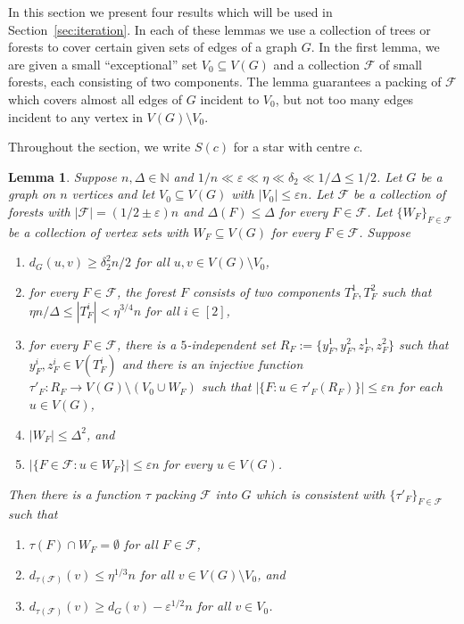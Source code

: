 \documentclass[a4paper, 11pt, reqno]{amsart}
\newtheorem{lemma}[definition]{Lemma}
\numberwithin{equation}{section}
\newcommand{\1}{{\rm 1\hspace*{-0.4ex}%
\rule{0.1ex}{1.52ex}\hspace*{0.2ex}}}
\newcommand{\N}{\mathbb N}
\newcommand{\cF}{\mathcal{F}}
\renewcommand{\epsilon}{\varepsilon}
\newcommand{\sm}{\setminus}
\newcommand{\sub}{\subseteq}
\newcommand{\COMMENT}[1]{}
\begin{document}
In this section we present four results which will be used in Section~\ref{sec:iteration}.
In each of these lemmas we use a collection of trees or forests to cover certain given sets of edges of a graph $G$. 
In the first lemma, we are given a small ``exceptional'' set $V_0\sub V(G)$ and 
a collection $\cF$ of small forests, each consisting of two components.
The lemma guarantees a packing of $\cF$ which covers almost all edges of $G$ incident to $V_0$, but not too many edges incident to any vertex in $V(G)\setminus V_0$.

Throughout the section, we write $S(c)$ for a star with centre $c$.

\begin{lemma}\label{lem: clear rl waste}
Suppose $n,\Delta \in \N$ and $1/n \ll \epsilon \ll \eta \ll \delta_2 \ll  1/\Delta\leq 1/2$.
Let $G$ be a graph on $n$ vertices and let $V_0\sub V(G)$ with $|V_0|\leq \epsilon n$.
Let $\cF$ be a collection of forests with $|\cF|=(1/2 \pm \epsilon )n$ and $\Delta(F)\leq \Delta$ for every $F\in \cF$. 
Let $\{W_F\}_{F\in \cF}$ be a collection of vertex sets with $W_F\sub V(G)$ for every $F\in \cF$. 
Suppose %
\begin{enumerate}[label=(c1.\arabic*)]
\item\label{item:L11} $d_{G}(u,v)\geq \delta_2^2 n/2$ for all $u,v\in V(G)\sm V_0$,
\item\label{item:L12} for every $F\in \cF$, the forest $F$ consists of two components $T_F^1, T_F^2$ such that $\eta n/\Delta \leq |T_{F}^i| < \eta^{3/4} n$ for all $i\in[2]$,\COMMENT{we only need one, but it is more convenient for the proof in Lemma 8.1.}
\item\label{item:L13} for every $F\in \cF$, 
there is a $5$-independent set $R_F:=\{y^1_F, y^2_F, z^1_F, z^2_F\}$ such that $y^i_F,z^i_F\in V(T_F^i)$
and there is an injective function $\tau'_F:R_F\to V(G)\sm (V_0 \cup W_F)$ such that $|\{F : u\in \tau'_F(R_F)\}| \leq \epsilon n$ for each $u\in V(G)$,
\item\label{item:L14}	$|W_F|\leq \Delta^2$, and
\item\label{item:L15} $|\{F \in \cF : u\in W_F\}|\leq \epsilon n$ for every $u\in V(G)$.
\end{enumerate}
Then there is a  function $\tau$ packing $\cF$ into $G$ which is consistent with $\{\tau'_F\}_{F\in \cF}$
such that 
\begin{enumerate}[label=(C1.\arabic*)]
\item\label{item:Q11} $\tau(F)\cap W_F=\emptyset$ for all $F\in \cF$,
\item\label{item:Q12} $d_{\tau(\cF)}(v)\leq \eta^{1/3}n$ for all $v\in V(G)\sm V_0$, and
\item\label{item:Q13} $d_{\tau(\cF)}(v) \geq d_{G}(v) - \epsilon^{1/2} n$ for all $v\in V_0$.
\end{enumerate}
\end{lemma}
\end{document}

